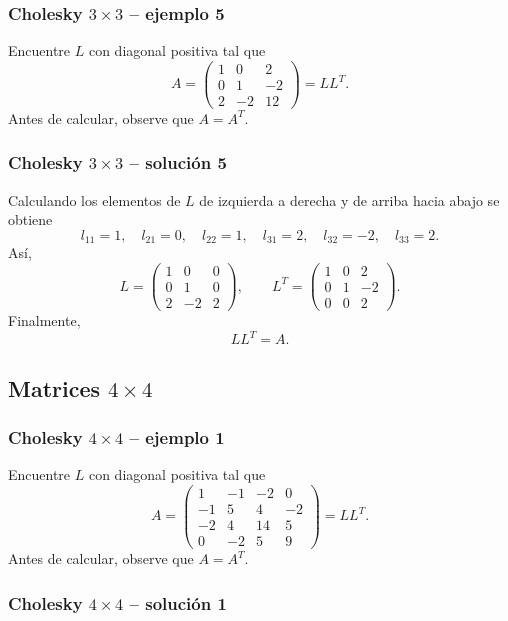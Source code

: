 \subsubsection*{Cholesky $3\times 3$ -- ejemplo 5}

Encuentre $L$ con diagonal positiva tal que
\[
A=\begin{pmatrix}1 & 0 & 2\\0 & 1 & -2\\2 & -2 & 12\end{pmatrix}=LL^T.
\]
Antes de calcular, observe que $A=A^T$.


\subsubsection*{Cholesky $3\times 3$ -- solución 5}

Calculando los elementos de $L$ de izquierda a derecha y de arriba hacia abajo se obtiene
\[
l_{11}=1,\quad l_{21}=0,\quad l_{22}=1,\quad l_{31}=2,\quad l_{32}=-2,\quad l_{33}=2.
\]
Así,
\[
L=\begin{pmatrix}1 & 0 & 0\\0 & 1 & 0\\2 & -2 & 2\end{pmatrix},\qquad L^T=\begin{pmatrix}1 & 0 & 2\\0 & 1 & -2\\0 & 0 & 2\end{pmatrix}.
\]
Finalmente,
\[
\boxed{LL^T=A}.
\]

\subsection{Matrices $4\times 4$}

\subsubsection*{Cholesky $4\times 4$ -- ejemplo 1}

Encuentre $L$ con diagonal positiva tal que
\[
A=\begin{pmatrix}1 & -1 & -2 & 0\\-1 & 5 & 4 & -2\\-2 & 4 & 14 & 5\\0 & -2 & 5 & 9\end{pmatrix}=LL^T.
\]
Antes de calcular, observe que $A=A^T$.


\subsubsection*{Cholesky $4\times 4$ -- solución 1}

